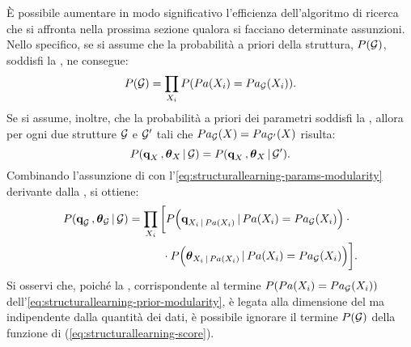 \`E possibile aumentare in modo significativo l'efficienza dell'algoritmo di ricerca che si affronta nella prossima sezione qualora si facciano determinate assunzioni. Nello specifico, se si assume che la probabilità a priori della struttura, $P(\mathcal{G})$, soddisfi la \emph{}, ne consegue:
\begin{equation}\label{eq:structurallearning-prior-modularity}
P(\mathcal{G})=\prod_{\mathnormal{X}_i} P(Pa(\mathnormal{X}_i) = Pa_{\mathcal{G}}(\mathnormal{X}_i))\text{.}
\end{equation}
Se si assume, inoltre, che la probabilità a priori dei parametri soddisfi la \emph{}, allora per ogni due strutture $\mathcal{G}$ e $\mathcal{G}^\prime$ tali che $Pa_{\mathcal{G}}(\mathnormal{X}) = Pa_{\mathcal{G}^\prime}(\mathnormal{X})$ risulta:
\begin{equation}\label{eq:structurallearning-params-modularity}
P(\boldsymbol{\textbf{\text{q}}}_{\mathnormal{X}}\,,\boldsymbol{\textbf{\text{$\theta$}}}_{\mathnormal{X}}\,\arrowvert\,\mathcal{G}) = P(\boldsymbol{\textbf{\text{q}}}_{\mathnormal{X}}\,,\boldsymbol{\textbf{\text{$\theta$}}}_{\mathnormal{X}}\,\arrowvert\,\mathcal{G}^\prime)\text{.}
\end{equation}
Combinando l'assunzione di \emph{} con l'\autoref{eq:structurallearning-params-modularity} derivante dalla \emph{}, si ottiene:
\begin{align}\label{eq:structurallearning-params-posterior}
P(\boldsymbol{\textbf{\text{q}}}_{\mathcal{G}}\,,\boldsymbol{\textbf{\text{$\theta$}}}_{\mathcal{G}}\,\arrowvert\,\mathcal{G}) &= \prod_{\mathnormal{X}_i} \bigg[ P\Big(\boldsymbol{\textbf{\text{q}}}_{\mathnormal{X}_i\,\arrowvert\,Pa(\mathnormal{X}_i)}\,\arrowvert\,Pa(\mathnormal{X}_i)=Pa_{\mathcal{G}}(\mathnormal{X}_i)\Big) \cdot \bigg.\nonumber\\
& \quad \bigg.{} \qquad \cdot P\Big(\boldsymbol{\textbf{\text{$\theta$}}}_{\mathnormal{X}_i\,\arrowvert\,Pa(\mathnormal{X}_i)}\,\arrowvert\,Pa(\mathnormal{X}_i)=Pa_{\mathcal{G}}(\mathnormal{X}_i)\Big) \bigg]\text{.}
\end{align}
Si osservi che, poiché la \emph{}, corrispondente al termine $P(Pa(\mathnormal{X}_i) = Pa_{\mathcal{G}}(\mathnormal{X}_i))$ dell'\autoref{eq:structurallearning-prior-modularity}, è legata alla dimensione del  ma indipendente dalla quantità dei dati, è possibile ignorare il termine $P(\mathcal{G})$ della funzione di  (\autoref{eq:structurallearning-score}).

